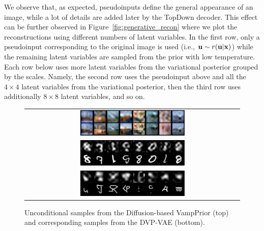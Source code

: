 We observe that, as expected, pseudoinputs define the general appearance of an image, while a lot of details are added later by the TopDown decoder. 
This effect can be further observed in Figure~\ref{fig:generative_recon} where we plot the reconstructions using different numbers of latent variables. In the first row, only a pseudoinput corresponding to the original image is used (i.e., ${\mathbf{u}} \sim r({\mathbf{u}}|{\mathbf{x}})$) while the remaining latent variables are sampled from the prior with low temperature. Each row below uses more latent variables from the variational posterior grouped by the scales. 
Namely, the second row uses the pseudoinput above and all the $4\times4$ latent variables from the variational posterior, then the third row uses additionally $8\times8$ latent variables, and so on. 

 \begin{figure}[t]
 \begin{center}
    \begin{tabular}{c}
        \includegraphics[width=0.5\textwidth]{pics/5_dvp/cifar10_dct_prior_samples.pdf} \\
        \includegraphics[width=0.5\textwidth]{pics/5_dvp/mnist_dct_prior_samples.pdf} \\
        \includegraphics[width=0.5\textwidth]{pics/5_dvp/omniglot_dct_prior_samples.pdf} \\
    \end{tabular}
    \end{center}
    \caption{Unconditional samples from the Diffusion-based VampPrior (top) and corresponding samples from the DVP-VAE (bottom).}
    \label{fig:dct_samples}
    \vskip 20pt
\end{figure}

